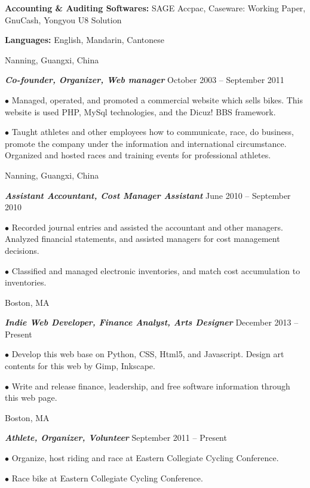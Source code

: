 \documentclass[10pt]{article}
\begin{document}
\noindent
{\bf Accounting \& Auditing Softwares:} SAGE Accpac, Caseware: Working Paper, GnuCash, Yongyou U8 Solution

\noindent
{\bf Languages:} English, Mandarin, Cantonese

\medskip


  \hfill Nanning, Guangxi, China

\noindent \textit{\textbf{Co-founder, Organizer, Web manager}} \hfill October 2003 -- September 2011

\hangindent=0.7cm $\bullet$ Managed, operated, and promoted a commercial website which sells bikes. This website is used PHP, MySql technologies, and the Dicuz! BBS framework.

\hangindent=0.7cm $\bullet$ Taught athletes and other employees how to communicate, race, do business, promote the company under the information and international circumstance. Organized and hosted races and training events for professional athletes.

\medskip

 \hfill Nanning, Guangxi, China

\noindent \textit{\textbf{Assistant Accountant, Cost Manager Assistant}} \hfill June 2010 -- September 2010

\hangindent=0.7cm $\bullet$ Recorded journal entries and assisted the accountant and other managers. Analyzed financial statements, and assisted managers for cost management decisions.

\hangindent=0.7cm $\bullet$ Classified and managed electronic inventories, and match cost accumulation to inventories.

\medskip


 \hfill Boston, MA

\noindent \textit{\textbf{Indie Web Developer, Finance Analyst, Arts Designer}} \hfill December 2013 -- Present

\hangindent=0.7cm $\bullet$ Develop this web base on Python, CSS, Html5, and Javascript. Design art contents for this web by Gimp, Inkscape.

\hangindent=0.7cm $\bullet$ Write and release finance, leadership, and free software information through this web page.

\medskip

 \hfill Boston, MA

\noindent \textit{\textbf{Athlete, Organizer, Volunteer}} \hfill September 2011 -- Present

\hangindent=0.7cm $\bullet$ Organize, host riding and race at Eastern Collegiate Cycling Conference.

\hangindent=0.7cm $\bullet$ Race bike at Eastern Collegiate Cycling Conference.
\end{document}
